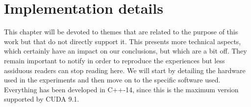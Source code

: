 
\appendix
\chapter{Implementation details}

This chapter will be devoted to themes that are related to the purpose of this work but that do not directly support it. This presents more technical aspects, which certainly have an impact on our conclusions, but which are a bit off. They remain important to notify in order to reproduce the experiences but less assiduous readers can stop reading here. We will start by detailing the hardware used in the experiments and then move on to the specific software used. Everything has been developed in C++-14, since this is the maximum version supported by CUDA 9.1.






